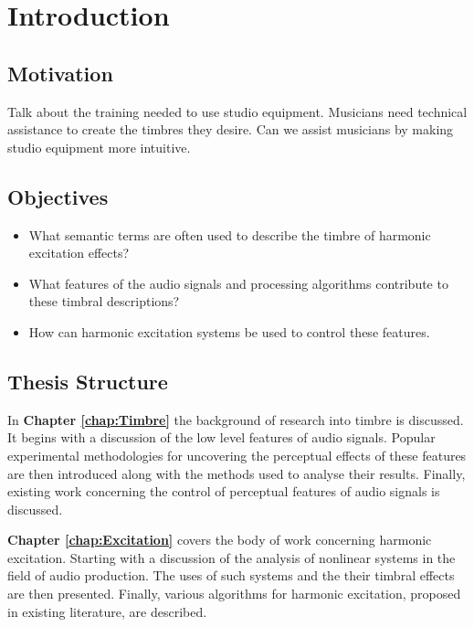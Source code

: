 \chapter{Introduction}
\label{chap:Introduction}

\section{Motivation}
\label{sec:Introduction-Motivation}
	\note
	{
		Talk about the training needed to use studio equipment. Musicians need technical assistance to create the
		timbres they desire. Can we assist musicians by making studio equipment more intuitive.
	}

\section{Objectives}
\label{sec:Introduction-Objectives}
	\begin{itemize}
		\item What semantic terms are often used to describe the timbre of harmonic excitation effects?
		\item What features of the audio signals and processing algorithms contribute to these timbral descriptions?
		\item How can harmonic excitation systems be used to control these features.
	\end{itemize}

\section{Thesis Structure}
\label{sec:Introduction-ThesisStructure}
	In {\bf{Chapter \ref{chap:Timbre}}} the background of research into timbre is discussed. It begins with a discussion
	of the low level features of audio signals. Popular experimental methodologies for uncovering the perceptual effects
	of these features are then introduced along with the methods used to analyse their results. Finally, existing work
	concerning the control of perceptual features of audio signals is discussed.

	{\bf{Chapter \ref{chap:Excitation}}} covers the body of work concerning harmonic excitation. Starting with a
	discussion of the analysis of nonlinear systems in the field of audio production. The uses of such systems and the
	their timbral effects are then presented. Finally, various algorithms for harmonic excitation, proposed in existing
	literature, are described.

